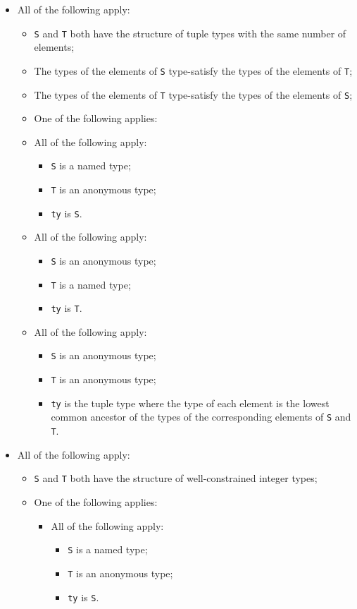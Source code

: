 \documentclass{book}
\begin{document}
\begin{itemize}
  \item All of the following apply:
    \begin{itemize}
    \item \texttt{S} and \texttt{T} both have the structure of tuple types with the same number of elements;
    \item The types of the elements of \texttt{S} type-satisfy the types of the elements of \texttt{T};
    \item The types of the elements of \texttt{T} type-satisfy the types of the elements of \texttt{S};
    \item One of the following applies:

      \item All of the following apply:
        \begin{itemize}
        \item \texttt{S} is a named type;
        \item \texttt{T} is an anonymous type;
        \item \texttt{ty} is \texttt{S}.
        \end{itemize}

      \item All of the following apply:
        \begin{itemize}
        \item \texttt{S} is an anonymous type;
        \item \texttt{T} is a named type;
        \item \texttt{ty} is \texttt{T}.
        \end{itemize}

     \item All of the following apply:
        \begin{itemize}
        \item \texttt{S} is an anonymous type;
        \item \texttt{T} is an anonymous type;
	\item \texttt{ty} is the tuple type where the type of each element is the lowest common
	  ancestor of the types of the corresponding elements of \texttt{S} and \texttt{T}. 
        \end{itemize}
    \end{itemize}

  \item All of the following apply:
    \begin{itemize}
    \item \texttt{S} and \texttt{T} both have the structure of well-constrained integer types;
    \item One of the following applies:
      \begin{itemize}
      \item All of the following apply:
        \begin{itemize}
        \item \texttt{S} is a named type;
        \item \texttt{T} is an anonymous type;
        \item \texttt{ty} is \texttt{S}.
        \end{itemize}


\end{itemize}
\end{itemize}
\end{itemize}
\end{document}
